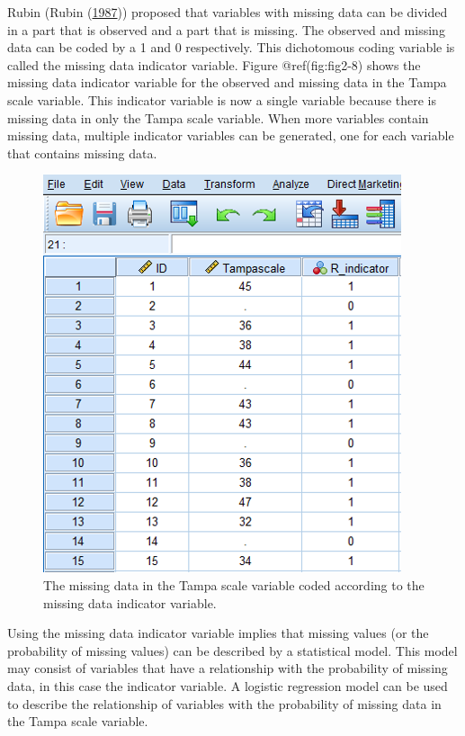 \documentclass[
]{book}
\begin{document}
Rubin (Rubin (\protect\hyperlink{ref-Rubin1987}{1987})) proposed that
variables with missing data can be divided in a part that is observed
and a part that is missing. The observed and missing data can be coded
by a 1 and 0 respectively. This dichotomous coding variable is called
the missing data indicator variable. Figure @ref(fig:fig2-8) shows the
missing data indicator variable for the observed and missing data in the
Tampa scale variable. This indicator variable is now a single variable
because there is missing data in only the Tampa scale variable. When
more variables contain missing data, multiple indicator variables can be
generated, one for each variable that contains missing data.

\begin{figure}

{\centering \includegraphics[width=0.8\linewidth]{images/fig2.8} 

}

\caption{The missing data in the Tampa scale variable coded according to the missing data indicator variable.}\label{fig:fig2-8}
\end{figure}

Using the missing data indicator variable implies that missing values
(or the probability of missing values) can be described by a statistical
model. This model may consist of variables that have a relationship with
the probability of missing data, in this case the indicator variable. A
logistic regression model can be used to describe the relationship of
variables with the probability of missing data in the Tampa scale
variable.
\end{document}

